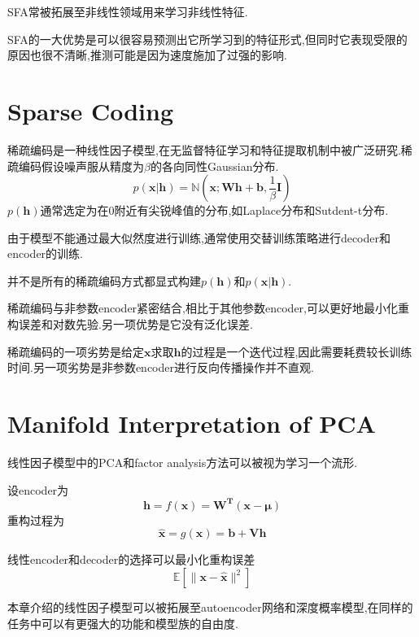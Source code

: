 SFA常被拓展至非线性领域用来学习非线性特征.

SFA的一大优势是可以很容易预测出它所学习到的特征形式,但同时它表现受限的原因也很不清晰,推测可能是因为速度施加了过强的影响.

\section{Sparse Coding}

稀疏编码是一种线性因子模型,在无监督特征学习和特征提取机制中被广泛研究.稀疏编码假设噪声服从精度为$\beta$的各向同性Gaussian分布.
\begin{equation}
p(\bm{x|h})=\mathbb N(\bm{x;Wh+b},\frac{1}{\beta}\bm I)
\end{equation}
$p(\bm h)$通常选定为在$0$附近有尖锐峰值的分布,如Laplace分布和Sutdent-t分布.

由于模型不能通过最大似然度进行训练,通常使用交替训练策略进行decoder和encoder的训练.

并不是所有的稀疏编码方式都显式构建$p(\bm h)$和$p(\bm{x|h})$.

稀疏编码与非参数encoder紧密结合,相比于其他参数encoder,可以更好地最小化重构误差和对数先验.另一项优势是它没有泛化误差.

稀疏编码的一项劣势是给定$\bm x$求取$\bm h$的过程是一个迭代过程,因此需要耗费较长训练时间.另一项劣势是非参数encoder进行反向传播操作并不直观.

\section{Manifold Interpretation of PCA}

线性因子模型中的PCA和factor analysis方法可以被视为学习一个流形.

设encoder为
\begin{equation}
\bm h=f(\bm x)=\bm{W^T(x-\bm\mu)}
\end{equation}
重构过程为
\begin{equation}
\hat{\bm x}=g(\bm x)=\bm{b+Vh}
\end{equation}

线性encoder和decoder的选择可以最小化重构误差
\begin{equation}
\mathbb E[\|\bm{x-\hat x}\|^2]
\end{equation}

本章介绍的线性因子模型可以被拓展至autoencoder网络和深度概率模型,在同样的任务中可以有更强大的功能和模型族的自由度.